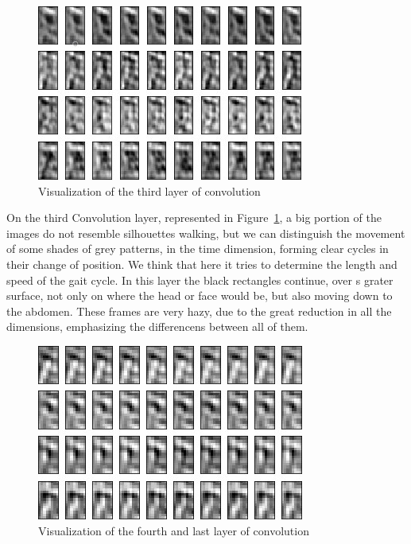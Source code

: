 \documentclass[12pt]{article}
\theoremstyle{definition}
\begin{document}
	\begin{figure}[ht]
		\includegraphics[width=\textwidth]{conv-see/visualization-8.jpg}
		\caption{Visualization of the third layer of convolution}
		\label{figure:visualize-conv-3}
	\end{figure}

	On the third Convolution layer, represented in Figure~\ref{figure:visualize-conv-3}, a big portion of the images do not resemble silhouettes walking, but we can distinguish the movement of some shades of grey patterns, in the time dimension, forming clear cycles in their change of position. We think that here it tries to determine the length and speed of the gait cycle. In this layer the black rectangles continue, over s grater surface, not only on where the head or face would be, but also moving down to the abdomen. These frames are very hazy, due to the great reduction in all the dimensions, emphasizing the differencens between all of them.

	\begin{figure}[ht]
		\includegraphics[width=\textwidth]{conv-see/visualization-16.jpg}
		\caption{Visualization of the fourth and last layer of convolution}
		\label{figure:visualize-conv-4}
	\end{figure}
\end{document}
